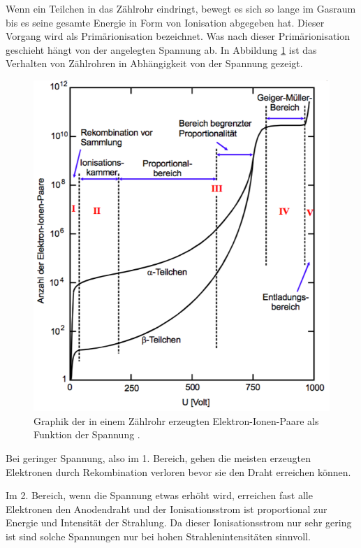 Wenn ein Teilchen in das Zählrohr eindringt, bewegt es sich so lange im Gasraum bis
es seine gesamte Energie in Form von Ionisation abgegeben hat. Dieser Vorgang wird als
Primärionisation bezeichnet. Was nach dieser Primärionisation geschieht hängt von der
angelegten Spannung ab. In Abbildung \ref{abb:2} ist das Verhalten von Zählrohren in
Abhängigkeit von der Spannung gezeigt.

\begin{figure}[H]
  \centering
  \includegraphics[width=\textwidth]{content/Primaerionisation.png}
  \caption{Graphik der in einem Zählrohr erzeugten Elektron-Ionen-Paare als Funktion
  der Spannung \cite{1}.}
  \label{abb:2}
\end{figure}

Bei geringer Spannung, also im 1. Bereich, gehen die meisten erzeugten Elektronen
durch Rekombination verloren bevor sie den Draht erreichen können.

Im 2. Bereich, wenn die Spannung etwas erhöht wird, erreichen fast alle Elektronen
den Anodendraht und der Ionisationsstrom ist proportional zur Energie und Intensität
der Strahlung. Da dieser Ionisationsstrom nur sehr gering ist sind solche Spannungen
nur bei hohen Strahlenintensitäten sinnvoll.

